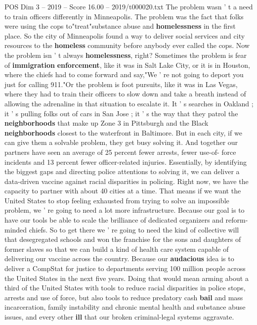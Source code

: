 \begin{textsample}{POS Dim 3 – 2019 – Score 16.00 – 2019/t000020.txt}
The problem wasn ' t a need to train officers differently in Minneapolis.
The problem was the fact that folks were using the cops to"treat"substance abuse and \textbf{homelessness} in the first place.
So the city of Minneapolis found a way to deliver social services and city resources to the \textbf{homeless} community before anybody ever called the cops.
Now the problem isn ' t always \textbf{homelessness}, right?
Sometimes the problem is fear of \textbf{immigration} \textbf{enforcement}, like it was in Salt Lake City, or it is in Houston, where the chiefs had to come forward and say,"We ' re not going to deport you just for calling 911."Or the problem is foot pursuits, like it was in Las Vegas, where they had to train their officers to slow down and take a breath instead of allowing the adrenaline in that situation to escalate it.
It ' s searches in Oakland ; it ' s pulling folks out of cars in San Jose ; it ' s the way that they patrol the \textbf{neighborhoods} that make up Zone 3 in Pittsburgh and the Black \textbf{neighborhoods} closest to the waterfront in Baltimore.
But in each city, if we can give them a solvable problem, they get busy solving it.
And together our partners have seen an average of 25 percent fewer arrests, fewer use-of- force incidents and 13 percent fewer officer-related injuries.
Essentially, by identifying the biggest gaps and directing police attentions to solving it, we can deliver a data-driven vaccine against racial disparities in policing.
Right now, we have the capacity to partner with about 40 cities at a time.
That means if we want the United States to stop feeling exhausted from trying to solve an impossible problem, we ' re going to need a lot more infrastructure.
Because our goal is to have our tools be able to scale the brilliance of dedicated organizers and reform-minded chiefs.
So to get there we ' re going to need the kind of collective will that desegregated schools and won the franchise for the sons and daughters of former slaves so that we can build a kind of health care system capable of delivering our vaccine across the country.
Because our \textbf{audacious} idea is to deliver a CompStat for justice to departments serving 100 million people across the United States in the next five years.
Doing that would mean arming about a third of the United States with tools to reduce racial disparities in police stops, arrests and use of force, but also tools to reduce predatory cash \textbf{bail} and mass incarceration, family instability and chronic mental health and substance abuse issues, and every other \textbf{ill} that our broken criminal-legal systems aggravate.

\end{textsample}
